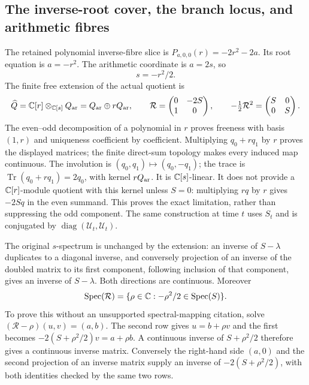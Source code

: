 \subsection{The inverse-root cover, the branch locus, and arithmetic fibres}
\label{sec:cq-cover}
The retained polynomial inverse-fibre slice is
$P_{a,0,0}(r)=-2r^2-2a$. Its root equation is $a=-r^2$.
The arithmetic coordinate is $a=2s$, so
\begin{equation}\label{eq:cq-cover}
 s=-r^2/2.
\end{equation}
The finite free extension of the actual quotient is
\[
 \widehat Q=\mathbb C[r]\otimes_{\mathbb C[s]}Q_{\rm ar}
           =Q_{\rm ar}\oplus rQ_{\rm ar},
 \qquad
 \mathcal R=\begin{pmatrix}0&-2S\\1&0\end{pmatrix},
 \qquad -\tfrac12\mathcal R^2=\begin{pmatrix}S&0\\0&S\end{pmatrix}.
\]
The even--odd decomposition of a polynomial in $r$ proves freeness
with basis $(1,r)$ and uniqueness coefficient by coefficient.
Multiplying $q_0+rq_1$ by $r$ proves the displayed matrices;
the finite direct-sum topology makes every induced map continuous.
The involution is $(q_0,q_1)\mapsto(q_0,-q_1)$; the trace is
$\operatorname{Tr}(q_0+rq_1)=2q_0$, with kernel $rQ_{\rm ar}$.
It is $\mathbb C[s]$-linear. It does not provide a $\mathbb C[r]$-module
quotient with this kernel unless $S=0$: multiplying $rq$ by $r$
gives $-2Sq$ in the even summand. This proves the exact limitation,
rather than suppressing the odd component. The same construction
at time $t$ uses $S_t$ and is conjugated by
$\operatorname{diag}(\mathcal U_t,\mathcal U_t)$.

The original $s$-spectrum is unchanged by the extension: an inverse
of $S-\lambda$ duplicates to a diagonal inverse, and conversely
projection of an inverse of the doubled matrix to its first component,
following inclusion of that component, gives an inverse of
$S-\lambda$. Both directions are continuous. Moreover
\begin{equation}\label{eq:cq-rspec}
 \operatorname{Spec}(\mathcal R)
 =\{\rho\in\mathbb C:-\rho^2/2\in\operatorname{Spec}(S)\}.
\end{equation}
To prove this without an unsupported spectral-mapping citation,
solve $(\mathcal R-\rho)(u,v)=(a,b)$. The second row gives
$u=b+\rho v$ and the first becomes
$-2(S+\rho^2/2)v=a+\rho b$. A continuous inverse of
$S+\rho^2/2$ therefore gives a continuous inverse matrix.
Conversely the right-hand side $(a,0)$ and the second projection
of an inverse matrix supply an inverse of $-2(S+\rho^2/2)$,
with both identities checked by the same two rows.

